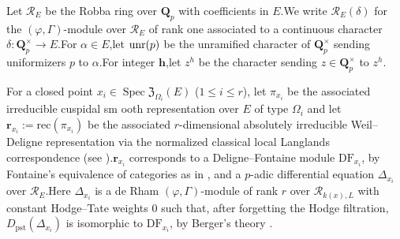 \documentclass[10pt]{article}
\DeclareMathOperator{\Spec}{Spec}
\newcommand{\unr}{{\rm unr}}
\newcommand{\df}{{\mathrm{DF}}}
\newcommand{\wdre}{{\textbf{r}}}
\newcommand{\bQ}{{\mathbf{Q}}}
\newcommand{\bh}{{\mathbf{h}}}
\newcommand{\cR}{\mathcal R}
\newcommand{\FZ}{{\mathfrak{Z}}}
\begin{document}
Let $\cR_{E}$ be the Robba ring over $\bQ_p$ with coefficients in $E$.\;We write $\cR_{E}(\delta)$ for the $(\varphi,\Gamma)$-module over $\cR_{E}$ of rank one associated to a continuous character $\delta:\bQ_p^\times\rightarrow E$.\;For $\alpha\in E$,\;let $\unr(p)$ be the unramified character of $\bQ_p^\times$ sending uniformizers $p$ to $\alpha$.\;For integer $\bh$,\;let $z^{h}$ be the character sending $z\in \bQ^\times_p$ to $z^{h}$.\;


For a closed point $x_i\in \Spec\FZ_{\Omega_{i}}(E)$ ($1\leq i\leq r$), let $\pi_{x_i}$ be the associated irreducible cuspidal sm ooth representation over $E$ of type $\Omega_i$ and let $\wdre_{x_i}:=\mathrm{rec}(\pi_{x_i})$ be the associated  $r$-dimensional absolutely irreducible Weil--Deligne representation via the normalized classical local Langlands correspondence (see \cite{scholze2013local}).\;$\wdre_{x_i}$ corresponds to a Deligne--Fontaine module $\df_{x_i}$, by Fontaine's equivalence of categories as in \cite[Proposition 4.1]{breuil2007first}, and a $p$-adic differential equation ${\Delta_{x_i}}$ over $\cR_{E}$.\;Here ${\Delta_{x_i}}$ is a de Rham $(\varphi,\Gamma)$-module of rank $r$ over $\cR_{k(x),L}$ with constant Hodge--Tate weights $0$ such that, after forgetting the Hodge filtration, $D_{\mathrm{pst}}(\Delta_{x_i})$ is isomorphic to $\df_{x_i}$, by Berger's theory \cite[Theorem A]{berger2008equations}.\;
\end{document}
